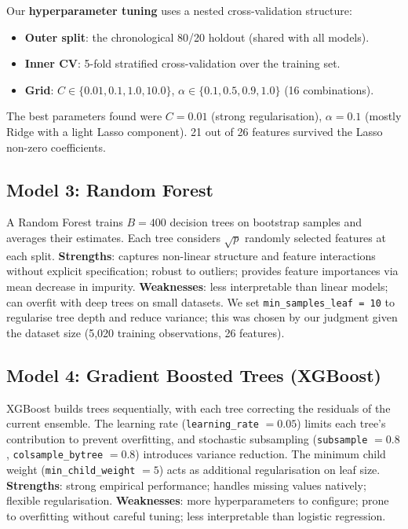 \documentclass{article}
\begin{document}
Our \textbf{hyperparameter tuning} uses a nested cross-validation structure:
\begin{itemize}
  \item \textbf{Outer split}: the chronological 80/20 holdout (shared with
  all models).
  \item \textbf{Inner CV}: 5-fold stratified cross-validation over the
  training set.
  \item \textbf{Grid}: $C \in \{0.01, 0.1, 1.0, 10.0\}$,
  $\alpha \in \{0.1, 0.5, 0.9, 1.0\}$ (16 combinations).
\end{itemize}
The best parameters found were $C = 0.01$ (strong regularisation),
$\alpha = 0.1$ (mostly Ridge with a light Lasso component).
21 out of 26 features survived the Lasso non-zero
coefficients.

\subsection{Model 3: Random Forest}

A Random Forest trains $B = 400$ decision trees on bootstrap samples and
averages their estimates.
Each tree considers $\sqrt{p}$ randomly selected features at each split.
\textbf{Strengths}: captures non-linear structure and feature interactions
without explicit specification; robust to outliers; provides feature
importances via mean decrease in impurity.
\textbf{Weaknesses}: less interpretable than linear models; can overfit with
deep trees on small datasets.
We set \texttt{min\_samples\_leaf = 10} to regularise tree depth and reduce
variance; this was chosen by our judgment given the dataset size
(5{,}020 training observations, 26 features).

\subsection{Model 4: Gradient Boosted Trees (XGBoost)}

XGBoost builds trees sequentially, with each tree correcting the residuals
of the current ensemble.
The learning rate (\texttt{learning\_rate} $= 0.05$) limits each tree's
contribution to prevent overfitting, and stochastic subsampling
(\texttt{subsample} $= 0.8$, \texttt{colsample\_bytree} $= 0.8$) introduces
variance reduction.
The minimum child weight (\texttt{min\_child\_weight} $= 5$) acts as
additional regularisation on leaf size.
\textbf{Strengths}: strong empirical performance; handles missing values
natively; flexible regularisation.
\textbf{Weaknesses}: more hyperparameters to configure; prone to overfitting
without careful tuning; less interpretable than logistic regression.
\end{document}
